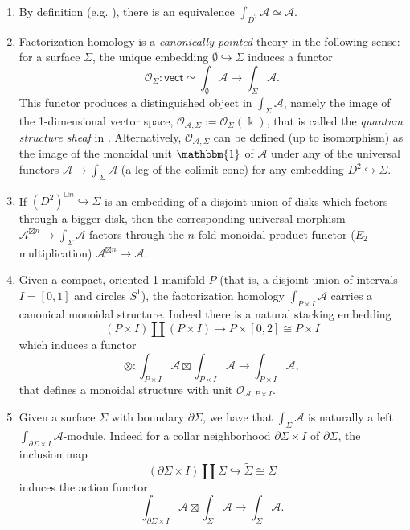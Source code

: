 \documentclass[11pt]{article}
\theoremstyle{definition}
\begin{document}
\begin{enumerate}[label=(\arabic*)]
\item By definition (e.g. \cite[Corollary 6.3.9]{riehlcat}), there is an equivalence $\int_{D^2} \mathcal{A} \simeq \mathcal{A}$.
\item Factorization homology is a \emph{canonically pointed} theory in the following sense: for a surface $\Sigma$, the unique embedding $\emptyset \hookrightarrow \Sigma$ induces a functor $$ \mathcal{O}_\Sigma: \mathsf{vect} \simeq \int_{\emptyset} \mathcal{A} \longrightarrow \int_\Sigma \mathcal{A}  .$$ This functor produces a distinguished object in $\int_\Sigma \mathcal{A}$, namely the image of the 1-dimensional vector space, $\mathcal{O}_{\mathcal{A}, \Sigma} := \mathcal{O}_\Sigma (\Bbbk)$, that is called the \emph{quantum structure sheaf} in \cite{bzbj}. Alternatively, $\mathcal{O}_{\mathcal{A}, \Sigma}$ can be defined (up to isomorphism) as the image of the monoidal unit $\mathbbm{1}$ of $\mathcal{A}$ under any of the universal functors $\mathcal{A} \longrightarrow \int_\Sigma \mathcal{A}$  (a leg of the colimit cone) for any embedding $D^2 \hookrightarrow \Sigma$. 


\item If $( D^2)^{\sqcup n} \hookrightarrow \Sigma $ is an embedding of a disjoint union of disks which factors through a bigger disk, then the corresponding universal morphism $\mathcal{A}^{\boxtimes n} \longrightarrow \int_\Sigma \mathcal{A}$ factors through the $n$-fold monoidal product functor ($E_2$ multiplication) $\mathcal{A}^{\boxtimes n} \longrightarrow \mathcal{A}$.



\item Given a compact, oriented 1-manifold $P$ (that is, a disjoint union of intervals $I=[0,1]$ and circles $S^1$), the factorization homology $\int_{P \times I} \mathcal{A}$ carries a canonical monoidal structure. Indeed there is a natural stacking embedding $$ (P \times I) \amalg (P \times I) \longrightarrow P \times [0,2] \cong P \times I $$
which induces a functor
$$ \otimes:  \int_{P \times I} \mathcal{A} \boxtimes \int_{P \times I}\mathcal{A} \longrightarrow \int_{P \times I}\mathcal{A},  $$ that defines a monoidal structure with unit $\mathcal{O}_{\mathcal{A}, P \times I}$. 




\item Given a surface $\Sigma$ with boundary $\partial \Sigma$, we have that $\int_\Sigma \mathcal{A}$ is naturally a left $\int_{\partial \Sigma \times I} \mathcal{A}$-module. Indeed for a  collar neighborhood $\partial \Sigma \times I$ of $\partial \Sigma$, the inclusion map
$$  (\partial \Sigma \times I )  \amalg \Sigma \hookrightarrow \widetilde{\Sigma} \cong \Sigma$$ induces the action functor $$ \int_{\partial \Sigma \times I} \mathcal{A} \boxtimes \int_\Sigma \mathcal{A} \longrightarrow  \int_\Sigma \mathcal{A}.$$


\end{enumerate}
\end{document}
